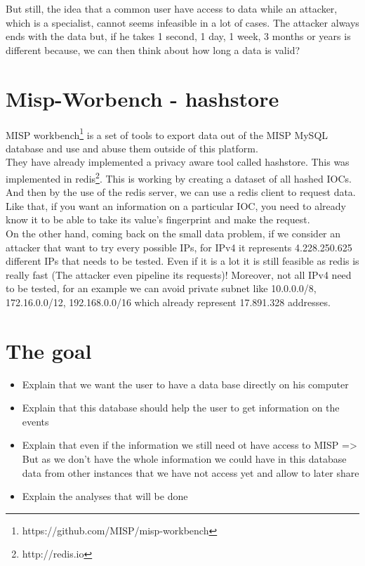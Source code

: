 \documentclass{eplmastersthesis}
\begin{document}
But still, the idea that a common user have access to data while an attacker, which is a specialist, cannot seems infeasible in a lot of cases. The attacker always ends with the data but, if he takes 1 second, 1 day, 1 week, 3 months or years is different because, we can then think about how long a data is valid? \\



\section{Misp-Worbench - hashstore}

MISP workbench\footnote{https://github.com/MISP/misp-workbench} is a set of tools to export data out of the MISP MySQL database and use and abuse them outside of this platform.\\

They have already implemented a privacy aware tool called hashstore. This was implemented in redis\footnote{http://redis.io}. This is working by creating a dataset of all hashed IOCs. And then by the use of the redis server, we can use a redis client to request data.\\
Like that, if you want an information on a particular IOC, you need to already know it to be able to take its value's fingerprint and make the request.\\
On the other hand, coming back on the small data problem, if we consider an attacker that want to try every possible IPs, for IPv4 it represents 4.228.250.625 different IPs that needs to be tested. Even if it is a lot it is still feasible as redis is really fast (The attacker even pipeline its requests)! Moreover, not all IPv4 need to be tested, for an example we can avoid private subnet like 10.0.0.0/8, 172.16.0.0/12, 192.168.0.0/16 which already represent 17.891.328 addresses.


\section{The goal}
\begin{itemize}
\item Explain that we want the user to have a data base directly on his computer 
\item Explain that this database should help the user to get information on the events
\item Explain that even if the information we still need ot have access to MISP => But as we don't have the whole information we could have in this database data from other instances that we have not access yet and allow to later share
\item Explain the analyses that will be done
\end{itemize}
\end{document}
